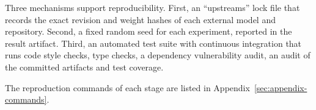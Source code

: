 Three mechanisms support reproducibility. First, an ``upstreams'' lock file that records
the exact revision and weight hashes of each external model and repository. Second, a fixed
random seed for each experiment, reported in the result artifact. Third, an automated test
suite with continuous integration that runs code style checks, type checks, a dependency
vulnerability audit, an audit of the committed artifacts and test coverage.

The reproduction commands of each stage are listed in
Appendix~\ref{sec:appendix-commands}.
